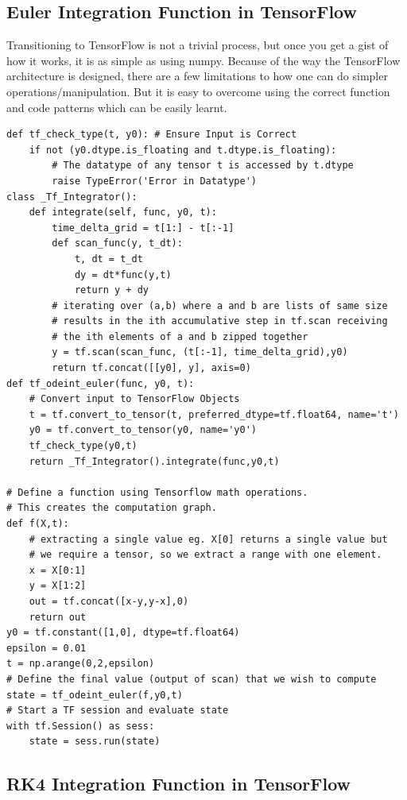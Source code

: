 \documentclass[10pt,letterpaper]{article}
\begin{document}
\subsection*{Euler Integration Function in TensorFlow}

Transitioning to TensorFlow is not a trivial process, but once you get a gist of how it works, it is as simple as using numpy. Because of the way the TensorFlow architecture is designed, there are a few limitations to how one can do simpler operations/manipulation. But it is easy to overcome using the correct function and code patterns which can be easily learnt.

\begin{verbatim}
def tf_check_type(t, y0): # Ensure Input is Correct
    if not (y0.dtype.is_floating and t.dtype.is_floating): 
        # The datatype of any tensor t is accessed by t.dtype
        raise TypeError('Error in Datatype')
class _Tf_Integrator():
    def integrate(self, func, y0, t): 
        time_delta_grid = t[1:] - t[:-1]  
        def scan_func(y, t_dt): 
            t, dt = t_dt
            dy = dt*func(y,t)
            return y + dy
        # iterating over (a,b) where a and b are lists of same size
        # results in the ith accumulative step in tf.scan receiving
        # the ith elements of a and b zipped together
        y = tf.scan(scan_func, (t[:-1], time_delta_grid),y0) 
        return tf.concat([[y0], y], axis=0)
def tf_odeint_euler(func, y0, t):
    # Convert input to TensorFlow Objects
    t = tf.convert_to_tensor(t, preferred_dtype=tf.float64, name='t')
    y0 = tf.convert_to_tensor(y0, name='y0')
    tf_check_type(y0,t)
    return _Tf_Integrator().integrate(func,y0,t)
    
# Define a function using Tensorflow math operations. 
# This creates the computation graph.
def f(X,t):
    # extracting a single value eg. X[0] returns a single value but
    # we require a tensor, so we extract a range with one element.
    x = X[0:1] 
    y = X[1:2]
    out = tf.concat([x-y,y-x],0)
    return out
y0 = tf.constant([1,0], dtype=tf.float64)
epsilon = 0.01
t = np.arange(0,2,epsilon)
# Define the final value (output of scan) that we wish to compute
state = tf_odeint_euler(f,y0,t)
# Start a TF session and evaluate state
with tf.Session() as sess:
    state = sess.run(state)
\end{verbatim}

\subsection*{RK4 Integration Function in TensorFlow}
\end{document}
